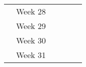 \documentclass[
  a4paper,  %
  twoside,  %
  bibliography=totoc,
  headsepline,
  cleardoublepage=empty,
  parskip=half,
  draft=false
]{scrbook}
\begin{document}
\begin{table}[]
\begin{tabular}{clllcc}
\multicolumn{1}{l}{}            & Week 28      &                   &                   & \multicolumn{1}{l}{}                                                                     & \multicolumn{1}{l}{}                                                                                                       \\
\multicolumn{1}{l}{}            & Week 29      &                   &                   & \multicolumn{1}{l}{}                                                                     & \multicolumn{1}{l}{}                                                                                                       \\
\multicolumn{1}{l}{}            & Week 30      &                   &                   & \multicolumn{1}{l}{}                                                                     & \multicolumn{1}{l}{}                                                                                                       \\
\multicolumn{1}{l}{}            & Week 31      &                   &                   & \multicolumn{1}{l}{}                                                                     & \multicolumn{1}{l}{}                                                                                                      
\end{tabular}
\end{table}



%

\pagestyle{empty}
\renewcommand*{\chapterpagestyle}{empty}
\Versicherung
\end{document}
